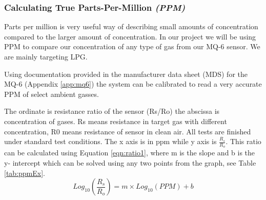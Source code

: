			\subsubsection{Calculating True Parts-Per-Million \textit{(PPM)}}
				\par Parts per million is very useful way of describing small amounts of concentration compared to the larger amount of concentration. In our project we will be using PPM to compare our concentration of any type of gas from our MQ-6 sensor. We are mainly targeting LPG.
				\par Using documentation provided in the manufacturer data sheet (MDS) for the MQ-6 (Appendix \ref{app:mq6}) the system can be calibrated to read a very accurate PPM of select ambient gasses.
				\par The ordinate is resistance ratio of the sensor (Rs/Ro)  the abscissa is concentration of gases. Rs means resistance in target gas with different concentration, R0 means resistance of sensor in clean air. All tests are finished under standard test conditions. The x axis is in ppm while y axis is $\frac{R_s}{R_o}$. This ratio can be calculated using Equation \ref{eqn:ratio1}, where m is the slope and b is the y- intercept which can be solved using any two points from the graph, see Table \ref{tab:ppmEx}. \\
				\begin{equation}
				Log_10(\frac{R_s}{R_o}) = m\times Log_10(PPM) + b
				\label{eqn:ratio1}
				\end{equation}
				

